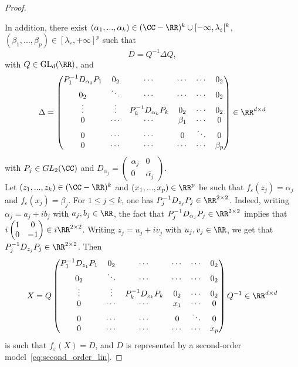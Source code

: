 \documentclass{article}
\begin{document}
\begin{proof}
\begin{itemize}
\end{itemize}

In addition, there exist $(\alpha_1, ..., \alpha_k) \in (\CC - \RR)^k \cup [-\infty, \lambda_{\varepsilon}[ ^k$, $(\beta_1,...,\beta_p) \in [\lambda_{\varepsilon},+\infty]^p$ such that 
$$
D = Q^{-1} \Delta Q,
$$
with $Q\in \mathrm{GL}_d{(\RR)}$,
and 
\begin{equation*}
\Delta=
\begin{pmatrix}
P_1^{-1}D_{\alpha_1} P_1 & 0_2 & \cdots & \cdots & \cdots & 0_2 \\
0_2 & \ddots & \cdots & \cdots & \cdots  & 0_2 \\
 \vdots & \vdots & P_k^{-1} D_{\alpha_k} P_k & 0_2 &  \cdots & 0_2 \\
0 & \cdots & \cdots & \beta_1 & \cdots   & 0 \\
0 & \cdots & \cdots & 0 & \ddots   & 0 \\
0 & \cdots & \cdots & \cdots & \cdots & \beta_p
\end{pmatrix} \in \RR^{d \times d}
\end{equation*}
with $P_j \in GL_2(\CC)$ and $D_{\alpha_j} = \begin{pmatrix}
\alpha_j & 0\\
0 & \bar{\alpha_j}
\end{pmatrix}$.
\\

Let $(z_1, ..., z_k) \in (\CC - \RR)^k $ and $(x_1,...,x_p) \in \RR^p$ be such that $f_{\varepsilon}(z_j) = \alpha_j$ and $f_{\varepsilon}(x_j) = \beta_j$. For $1 \leq j \leq k$, one has $P_j^{-1} D_{z_j} P_j \in \RR^{2\times2}$. Indeed, writing $\alpha_j = a_j + i b_j$ with $a_j, b_j \in \RR$, the fact that $P_j^{-1} D_{\alpha_j} P_j \in \RR^{2\times2}$ implies that $i \begin{pmatrix}
1 & 0\\
0 & -1
\end{pmatrix} \in i \RR^{2\times2}$. Writing $z_j = u_j + i v_j $ with $u_j, v_j \in \RR$, we get that $P_j^{-1} D_{z_j} P_j \in \RR^{2\times2}$.
Then
\begin{equation*}
X= Q 
\begin{pmatrix}
P_1^{-1}D_{z_1} P_1 & 0_2 & \cdots & \cdots & \cdots & 0_2 \\
0_2 & \ddots & \cdots & \cdots & \cdots  & 0_2 \\
 \vdots & \vdots & P_k^{-1} D_{z_k} P_k & 0_2 &  \cdots & 0_2 \\
0 & \cdots & \cdots & x_1 & \cdots   & 0 \\
0 & \cdots & \cdots & 0 & \ddots   & 0 \\
0 & \cdots & \cdots & \cdots & \cdots & x_p
\end{pmatrix} Q^{-1} \in \RR^{d \times d}
\end{equation*}
is such that $f_{\varepsilon}(X) = D$, and $D$ is represented by a second-order model~\eqref{eq:second_order_lin}.
\end{proof} 
\end{document}
